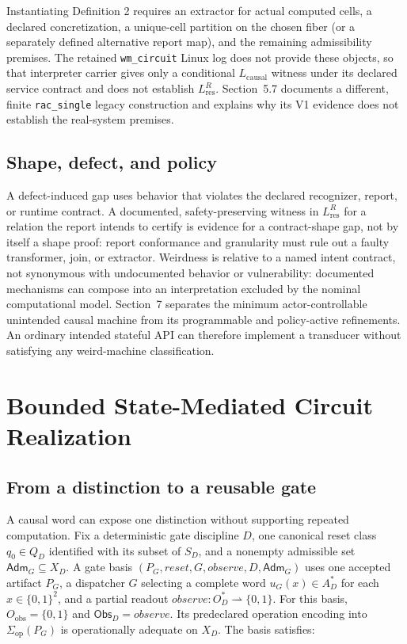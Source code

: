 \documentclass[conference]{IEEEtran}
\begin{document}
Instantiating Definition 2 requires an extractor for actual computed cells, a declared concretization, a unique-cell partition on the chosen fiber (or a separately defined alternative report map), and the remaining admissibility premises. The retained \texttt{wm\_circuit} Linux log does not provide these objects, so that interpreter carrier gives only a conditional $L_{\mathrm{causal}}$ witness under its declared service contract and does not establish $L_{\mathrm{res}}^R$. Section~5.7 documents a different, finite \texttt{rac\_single} legacy construction and explains why its V1 evidence does not establish the real-system premises.

\subsection{Shape, defect, and policy}

A defect-induced gap uses behavior that violates the declared recognizer, report, or runtime contract. A documented, safety-preserving witness in $L_{\mathrm{res}}^R$ for a relation the report intends to certify is evidence for a contract-shape gap, not by itself a shape proof: report conformance and granularity must rule out a faulty transformer, join, or extractor. Weirdness is relative to a named intent contract, not synonymous with undocumented behavior or vulnerability: documented mechanisms can compose into an interpretation excluded by the nominal computational model. Section~7 separates the minimum actor-controllable unintended causal machine from its programmable and policy-active refinements. An ordinary intended stateful API can therefore implement a transducer without satisfying any weird-machine classification.

\section{Bounded State-Mediated Circuit Realization}

\subsection{From a distinction to a reusable gate}

A causal word can expose one distinction without supporting repeated computation. Fix a deterministic gate discipline $D$, one canonical reset class $q_0\in Q_D$ identified with its subset of $S_D$, and a nonempty admissible set $\mathsf{Adm}_G\subseteq X_D$. A gate basis $(P_G,\mathit{reset},G,\mathit{observe},D,\mathsf{Adm}_G)$ uses one accepted artifact $P_G$, a dispatcher $G$ selecting a complete word $u_G(x)\in A_D^*$ for each $x\in\{0,1\}^2$, and a partial readout $\mathit{observe}:O_D^*\rightharpoonup\{0,1\}$. For this basis, $O_{\mathrm{obs}}=\{0,1\}$ and $\mathsf{Obs}_D=\mathit{observe}$. Its predeclared operation encoding into $\Sigma_{\mathrm{op}}(P_G)$ is operationally adequate on $X_D$. The basis satisfies:
\end{document}
